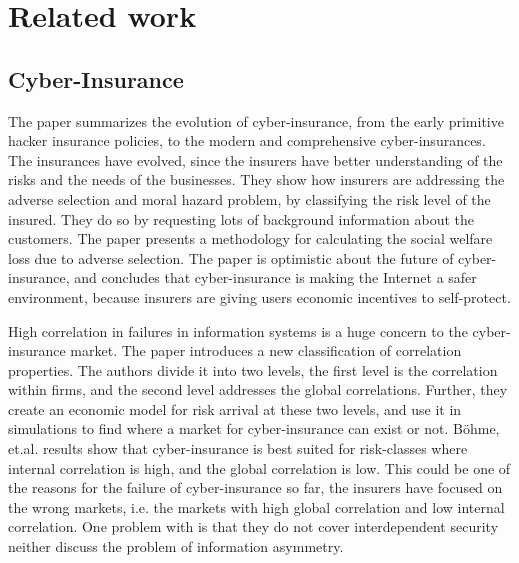 \chapter{Related work}
\label{chp:relatedwork} 



\section{Cyber-Insurance}

The paper \cite{majuca2006evolution} summarizes the evolution of cyber-insurance, from the early primitive hacker insurance policies, to the modern and comprehensive cyber-insurances. The insurances have evolved, since the insurers have better understanding of the risks and the needs of the businesses. They show how insurers are addressing the adverse selection and moral hazard problem, by classifying the risk level of the insured. They do so by requesting lots of background information about the customers. The paper presents a methodology for calculating the social welfare loss due to adverse selection. The paper is optimistic about the future of cyber-insurance, and concludes that cyber-insurance is making the Internet a safer environment, because insurers are giving users economic incentives to self-protect. 

High correlation in failures in information systems is a huge concern to the cyber-insurance market. The paper \cite{bohme2006models} introduces a new classification of correlation properties. The authors divide it into two levels, the first level is the correlation within firms, and the second level addresses the global correlations. Further, they create an economic model for risk arrival at these two levels, and use it in simulations to find where a market for cyber-insurance can exist or not. Böhme, et.al. results show that cyber-insurance is best suited for risk-classes where internal correlation is high, and the global correlation is low. This could be one of the reasons for the failure of cyber-insurance so far, the insurers have focused on the wrong markets, i.e. the markets with high global correlation and low internal correlation. One problem with \cite{bohme2006models} is that they do not cover interdependent security neither discuss the problem of information asymmetry.  

